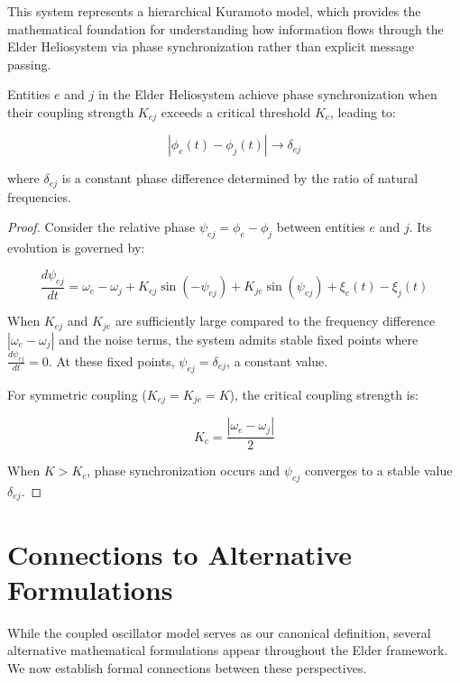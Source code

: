 This system represents a hierarchical Kuramoto model, which provides the mathematical foundation for understanding how information flows through the Elder Heliosystem via phase synchronization rather than explicit message passing.

\begin{theorem}
Entities $e$ and $j$ in the Elder Heliosystem achieve phase synchronization when their coupling strength $K_{ej}$ exceeds a critical threshold $K_c$, leading to:

\begin{equation}
|\phi_e(t) - \phi_j(t)| \to \delta_{ej}
\end{equation}

where $\delta_{ej}$ is a constant phase difference determined by the ratio of natural frequencies.
\end{theorem}

\begin{proof}
Consider the relative phase $\psi_{ej} = \phi_e - \phi_j$ between entities $e$ and $j$. Its evolution is governed by:

\begin{equation}
\frac{d\psi_{ej}}{dt} = \omega_e - \omega_j + K_{ej}\sin(-\psi_{ej}) + K_{je}\sin(\psi_{ej}) + \xi_e(t) - \xi_j(t)
\end{equation}

When $K_{ej}$ and $K_{je}$ are sufficiently large compared to the frequency difference $|\omega_e - \omega_j|$ and the noise terms, the system admits stable fixed points where $\frac{d\psi_{ej}}{dt} = 0$. At these fixed points, $\psi_{ej} = \delta_{ej}$, a constant value.

For symmetric coupling ($K_{ej} = K_{je} = K$), the critical coupling strength is:

\begin{equation}
K_c = \frac{|\omega_e - \omega_j|}{2}
\end{equation}

When $K > K_c$, phase synchronization occurs and $\psi_{ej}$ converges to a stable value $\delta_{ej}$.
\end{proof}

\section{Connections to Alternative Formulations}

While the coupled oscillator model serves as our canonical definition, several alternative mathematical formulations appear throughout the Elder framework. We now establish formal connections between these perspectives.

